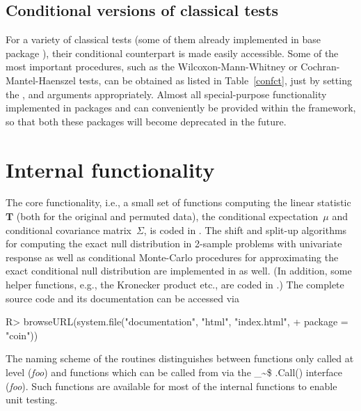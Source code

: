\documentclass{Z}
\makeatletter
\newcommand{\T}{\mathbf{T}}
\newcommand\Rcmd{\bgroup\@makeother\_\@makeother\~\@makeother\$\@codez}
\def\@codez#1{{\normalfont\ttfamily\hyphenchar\font=-1 #1()}\egroup}
\makeatother
\begin{document}
\subsection{Conditional versions of classical tests}

For a variety of classical tests (some of them already implemented in
base package ), their conditional counterpart is made easily
accessible. Some of the most important procedures, such as
the Wilcoxon-Mann-Whitney or Cochran-Mantel-Haenszel tests, 
can be obtained as listed in Table~\ref{confct}, just by setting the
,  and  arguments appropriately.  
Almost all special-purpose functionality
implemented in packages 
\citep{Rnews:Hothorn:2001,HothornHornik:2002:CompStat,pkg:exactRankTests}
and  \citep{Rnews:Hothorn+Lausen:2002,pkg:maxstat} can
conveniently be provided within the  framework, so that both
these packages will become deprecated in the future.


\section{Internal functionality}

The core functionality, i.e., a small set of 
functions computing the linear statistic $\T$ (both for the original and
permuted data), the conditional expectation~$\mu$
and conditional covariance matrix~$\Sigma$, is coded in . 
The shift and split-up algorithms \citep{axact-dist:1986,exakte-ver:1987,vdWiel2001}
for computing the exact null distribution in 2-sample problems with univariate response
as well as conditional Monte-Carlo procedures for approximating the
exact conditional null distribution are implemented in  as well.
(In addition,
some helper functions, e.g., the Kronecker product etc., are coded in .)
The complete  source code and its documentation can be accessed via
\begin{Schunk}
\begin{Sinput}
R> browseURL(system.file("documentation", "html", "index.html", 
+                       package = "coin"))
\end{Sinput}
\end{Schunk}
The naming scheme of the  routines distinguishes between functions
only called at  level (\textit{foo}) and functions which can 
be called from  via the \Rcmd{.Call} interface (\textit{foo}). 
Such functions are available for most of the internal  functions to enable
unit testing.
\end{document}
